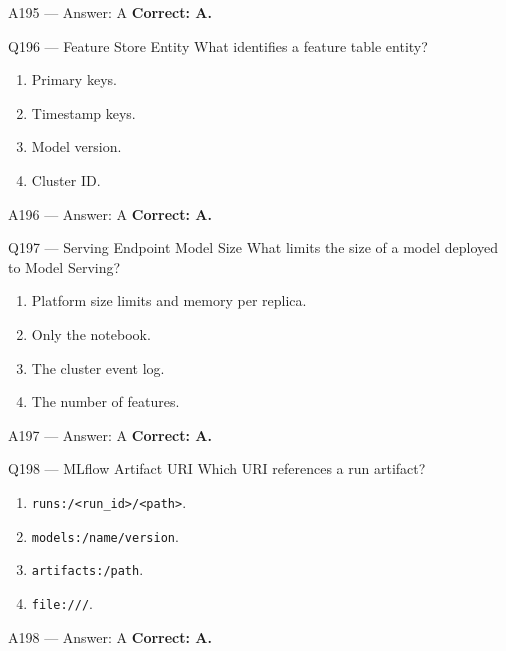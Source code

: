 \documentclass[aspectratio=169,9pt]{beamer}
\begin{document}
	\begin{frame}{A195 --- Answer: A}
		\textbf{Correct: A.}
	\end{frame}
	
	\begin{frame}{Q196 --- Feature Store Entity}
		What identifies a feature table entity?
		\begin{enumerate}[label=\Alph*.]
			\item Primary keys.
			\item Timestamp keys.
			\item Model version.
			\item Cluster ID.
		\end{enumerate}
	\end{frame}
	
	\begin{frame}{A196 --- Answer: A}
		\textbf{Correct: A.}
	\end{frame}
	
	\begin{frame}{Q197 --- Serving Endpoint Model Size}
		What limits the size of a model deployed to Model Serving?
		\begin{enumerate}[label=\Alph*.]
			\item Platform size limits and memory per replica.
			\item Only the notebook.
			\item The cluster event log.
			\item The number of features.
		\end{enumerate}
	\end{frame}
	
	\begin{frame}{A197 --- Answer: A}
		\textbf{Correct: A.}
	\end{frame}
	
	\begin{frame}{Q198 --- MLflow Artifact URI}
		Which URI references a run artifact?
		\begin{enumerate}[label=\Alph*.]
			\item \texttt{runs:/<run\_id>/<path>}.
			\item \texttt{models:/name/version}.
			\item \texttt{artifacts:/path}.
			\item \texttt{file:///}.
		\end{enumerate}
	\end{frame}
	
	\begin{frame}{A198 --- Answer: A}
		\textbf{Correct: A.}
	\end{frame}
	
\end{document}
